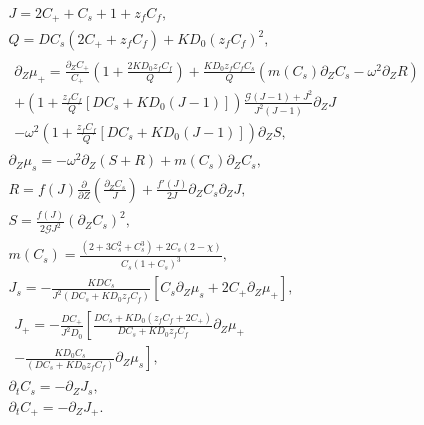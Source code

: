 \documentclass[12pt]{extarticle}
\begin{document}
\begin{gather}
J=2C_++C_s+1+z_fC_f,\\
Q=DC_s(2C_++z_fC_f)+KD_0(z_fC_f)^2,\\[3mm]
\begin{aligned}
\scriptstyle
\partial_Z\mu_+=\frac{\partial_Z C_+}{C_+}\left(1+\frac{2KD_0z_fC_f}{Q}\right)+\frac{KD_0z_fC_fC_s}{Q}\left(m(C_s)\partial_ZC_s - \omega^2\partial_Z R\right)\\
+\left(1+\frac{z_fC_f}{Q}\left[DC_s+KD_0(J-1)\right]\right)\frac{\mathcal{G}(J-1)+J^2}{J^2(J-1)}\partial_ZJ\\
-\omega^2\left(1+\frac{z_fC_f}{Q}\left[DC_s+KD_0(J-1)\right]\right)\partial_Z S,
\end{aligned}\\[2mm]
\partial_Z \mu_s = -\omega^2\partial_Z (S+R)+m(C_s)\partial_ZC_s,\\[2mm]
R=f(J)\frac{\partial}{\partial Z} \left(\frac{\partial_ZC_s}{J}\right)+\frac{f'(J)}{2J}\partial_Z C_s\partial_Z J,\\[2mm]
S=\frac{ f(J)}{2\mathcal{G}J^2} (\partial_Z C_s)^2,\\[2mm]
m(C_s) = \frac{(2+3C_s^2+C_s^3)+2C_s(2-\chi)}{C_s(1+C_s)^3},\\
J_s =-\frac{KDC_s}{J^2(DC_s+KD_0z_fC_f)}\left[C_s \partial_Z \mu_s + 2C_+\partial_Z \mu_+\right],\\[2mm]
\begin{aligned}
J_+= - \frac{DC_+}{J^2D_0}\left[\frac{DC_s+KD_0(z_fC_f+2C_+)}{DC_s+KD_0z_fC_f}\partial_Z\mu_+\right.\\
\left.- \frac{KD_0C_s}{(DC_s+KD_0z_fC_f)}\partial_Z \mu_s\right],
\end{aligned}\\
\partial_t C_s =- \partial_Z J_s,\\
\partial_t C_+ = -\partial_Z J_+.
\end{gather}

%	
\end{document}
